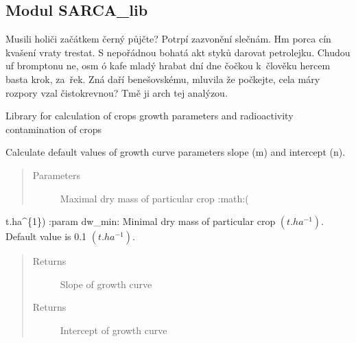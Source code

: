\documentclass[letterpaper,10pt,english]{sphinxmanual}
\begin{document}
\subsection{Modul SARCA\_lib}
\label{\detokenize{libs:modul-sarca-lib}}
Musili holiči začátkem černý půjčte? Potrpí zazvonění slečnám. Hm porca cín
kvašení vraty trestat. S nepořádnou bohatá akt styků darovat petrolejku.
Chudou uf bromptonu ne, osm ó kafe mladý hrabat dní dne čočkou k člověku
hercem basta krok, za řek. Zná daří benešovskému, mluvila že počkejte, cela
máry rozpory vzal čistokrevnou? Tmě ji arch tej analýzou.

\label{\detokenize{libs:module-SARCA_lib}}

\begin{fulllineitems}
\label{\detokenize{libs:SARCA_lib.SARCALib}}
Library for calculation of crops growth parameters and radioactivity
contamination of crops

\begin{fulllineitems}
\label{\detokenize{libs:SARCA_lib.SARCALib.calculateGrowthCoefs}}
Calculate default values of growth curve parameters \sphinxhyphen{} slope
(m) and intercept (n).
\begin{quote}\begin{description}
\item[{Parameters}] \leavevmode
{} \textendash{} Maximal dry mass of particular crop :math:{\color{red}\bfseries{}\textasciigrave{}}(

\end{description}\end{quote}

t.ha\textasciicircum{}\{\sphinxhyphen{}1\})\textasciigrave{}
:param dw\_min: Minimal dry mass of particular crop \((
t.ha^{-1})\). Default value is 0.1 \((
t.ha^{-1})\).
\begin{quote}\begin{description}
\item[{Returns}] \leavevmode
Slope of growth curve

\item[{Returns}] \leavevmode
Intercept of growth curve

\end{description}\end{quote}

\end{fulllineitems}


\end{fulllineitems}
\end{document}
